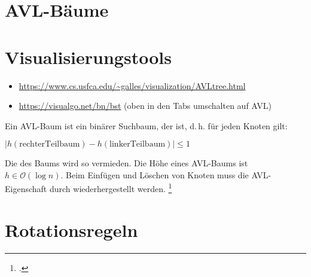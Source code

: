 \documentclass{lehramt-informatik}
\begin{document}

\section{AVL-Bäume}

\begin{quellen}
\item \cite{wiki:avl-baum}
\item \cite[Kapitel 14.4.2, Seite 378-386 (PDF 394-402)]{saake}
\item \cite[bst]{net:html:visualgo}
\end{quellen}

%

\section{Visualisierungstools}

\begin{itemize}
\item \url{https://www.cs.usfca.edu/~galles/visualization/AVLtree.html}
\item \url{https://visualgo.net/bn/bst} (oben in den Tabs umschalten auf AVL)
\end{itemize}

\noindent
Ein AVL-Baum ist ein binärer Suchbaum, der  ist,
d.\,h. für jeden Knoten gilt:

\begin{center}
$|h(\text{rechterTeilbaum}) - h(\text{linkerTeilbaum})| \leq 1$
\end{center}

\noindent
Die  des Baums wird so vermieden. Die Höhe eines
AVL-Baums ist $h \in \mathcal{O}(\log n)$. Beim Einfügen und Löschen von
Knoten muss die AVL-Eigenschaft durch 
wiederhergestellt werden.
\footcite[Seite 22 (PDF 16)]{aud:fs:5}

%

\section{Rotationsregeln}
\end{document}
